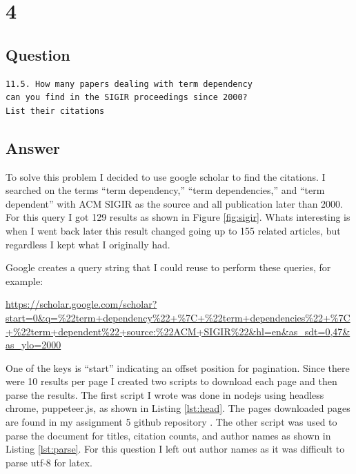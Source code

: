 \documentclass[letterpaper,11pt]{article}
\begin{document}
\clearpage


\section*{4}

\subsection*{Question}

\begin{verbatim}
11.5. How many papers dealing with term dependency 
can you find in the SIGIR proceedings since 2000?
List their citations
\end{verbatim}

\subsection*{Answer}

To solve this problem I decided to use google scholar to find the citations.
I searched on the terms ``term dependency,'' ``term dependencies,'' and ``term dependent'' with ACM SIGIR as the source and all publication later than 2000.
For this query I got 129 results as shown in Figure \ref{fig:sigir}.
Whats interesting is when I went back later this result changed going up to 155 related articles, but regardless I kept what I originally had.

Google creates a query string that I could reuse to perform these queries, for example:

\url{https://scholar.google.com/scholar?start=0&q=\%22term+dependency\%22+\%7C+\%22term+dependencies\%22+\%7C+\%22term+dependent\%22+source:\%22ACM+SIGIR\%22&hl=en&as_sdt=0,47&as_ylo=2000}

One of the keys is ``start'' indicating an offset position for pagination.
Since there were 10 results per page I created two scripts to download each page and then parse the results.
The first script I wrote was done in nodejs using headless chrome, puppeteer.js, as shown in Listing \ref{lst:head}.
The pages downloaded pages are found in my assignment 5 github repository \cite{github}.
The other script was used to parse the document for titles, citation counts, and author names as shown in Listing \ref{lst:parse}.
For this question I left out author names as it was difficult to parse utf-8 for latex.
\end{document}
